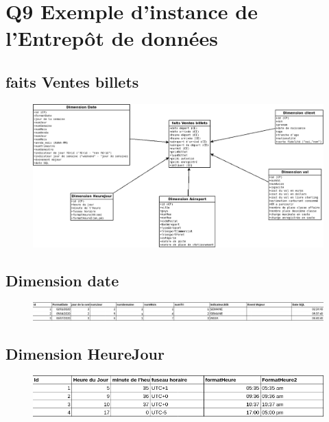 \documentclass[oneside,13pt,a4paper]{article}
\begin{document}
\section{Q9 Exemple d'instance de l'Entrepôt de données}

\subsection{faits Ventes billets}
\begin{figure}[h]
  \centering
  \includegraphics[width=1\textwidth]{img/venteBillet.png}
  
\end{figure}
\subsection{Dimension date}
\begin{figure}[h]
  \centering
  \includegraphics[width=1\textwidth]{img/date.png}
  
\end{figure}

\subsection{Dimension HeureJour}
\begin{figure}[h]
  \centering
  \includegraphics[width=1\textwidth]{img/heureJour.png}
  
\end{figure}
\end{document}
